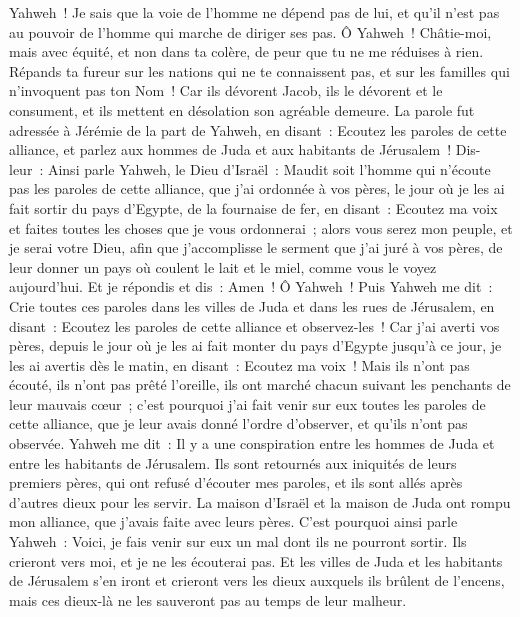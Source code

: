 \begin{multicols}{2}
Yahweh~! Je sais que la voie de l'homme ne dépend pas de lui, et qu'il n'est pas au pouvoir de l'homme qui marche de diriger ses pas.
Ô Yahweh~! Châtie-moi, mais avec équité, et non dans ta colère, de peur que tu ne me réduises à rien.
Répands ta fureur sur les nations qui ne te connaissent pas, et sur les familles qui n'invoquent pas ton Nom~! Car ils dévorent Jacob, ils le dévorent et le consument, et ils mettent en désolation son agréable demeure.
\VerseOne{}La parole fut adressée à Jérémie de la part de Yahweh, en disant~:
Ecoutez les paroles de cette alliance, et parlez aux hommes de Juda et aux habitants de Jérusalem~!
Dis-leur~: Ainsi parle Yahweh, le Dieu d'Israël~: Maudit soit l'homme qui n'écoute pas les paroles de cette alliance,
que j'ai ordonnée à vos pères, le jour où je les ai fait sortir du pays d'Egypte, de la fournaise de fer, en disant~: Ecoutez ma voix et faites toutes les choses que je vous ordonnerai~; alors vous serez mon peuple, et je serai votre Dieu,
afin que j'accomplisse le serment que j'ai juré à vos pères, de leur donner un pays où coulent le lait et le miel, comme vous le voyez aujourd'hui. Et je répondis et dis~: Amen~! Ô Yahweh~!
Puis Yahweh me dit~: Crie toutes ces paroles dans les villes de Juda et dans les rues de Jérusalem, en disant~: Ecoutez les paroles de cette alliance et observez-les~!
Car j'ai averti vos pères, depuis le jour où je les ai fait monter du pays d'Egypte jusqu'à ce jour, je les ai avertis dès le matin, en disant~: Ecoutez ma voix~!
Mais ils n'ont pas écouté, ils n'ont pas prêté l'oreille, ils ont marché chacun suivant les penchants de leur mauvais cœur~; c'est pourquoi j'ai fait venir sur eux toutes les paroles de cette alliance, que je leur avais donné l'ordre d'observer, et qu'ils n'ont pas observée.
Yahweh me dit~: Il y a une conspiration entre les hommes de Juda et entre les habitants de Jérusalem.
Ils sont retournés aux iniquités de leurs premiers pères, qui ont refusé d'écouter mes paroles, et ils sont allés après d'autres dieux pour les servir. La maison d'Israël et la maison de Juda ont rompu mon alliance, que j'avais faite avec leurs pères.
C'est pourquoi ainsi parle Yahweh~: Voici, je fais venir sur eux un mal dont ils ne pourront sortir. Ils crieront vers moi, et je ne les écouterai pas.
Et les villes de Juda et les habitants de Jérusalem s'en iront et crieront vers les dieux auxquels ils brûlent de l'encens, mais ces dieux-là ne les sauveront pas au temps de leur malheur.

\end{multicols}
